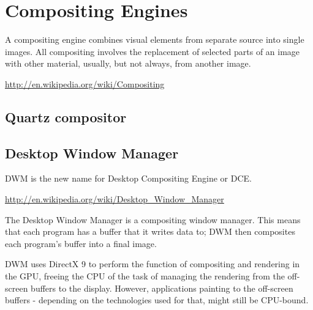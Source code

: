 \chapter{Compositing Engines}
\label{sec:compositing_engine}  


A compositing engine combines visual elements from separate source into single
images.
All compositing involves the replacement of selected parts of an image with
other material, usually, but not always, from another image.

\url{http://en.wikipedia.org/wiki/Compositing}

\section{Quartz compositor}
\label{sec:Quartz_compositor}



\section{ Desktop Window Manager}

DWM is the new name for Desktop Compositing Engine or DCE.

\url{http://en.wikipedia.org/wiki/Desktop_Window_Manager}


The Desktop Window Manager is a compositing window manager.
This means that each program has a buffer that it writes data to; DWM then
composites each program's buffer into a final image.
  
  
DWM uses DirectX 9 to perform the function of compositing and rendering in the
GPU, freeing the CPU of the task of managing the rendering from the off-screen
buffers to the display.
However, applications painting to the off-screen buffers - depending on the
technologies used for that, might still be CPU-bound.
  
  
  